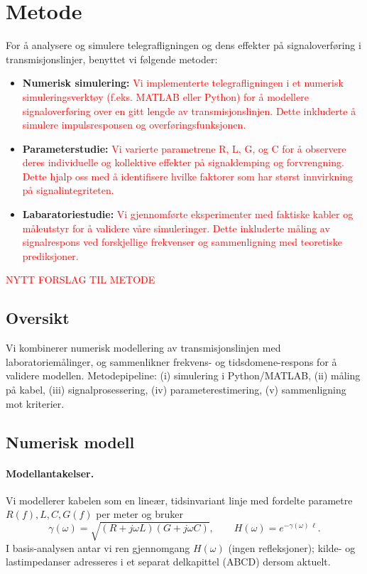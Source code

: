 \section{Metode}

For å analysere og simulere telegrafligningen og dens effekter på signaloverføring i transmisjonslinjer, benyttet vi følgende metoder:

\begin{itemize}
    
    \item \textbf{Numerisk simulering:} \textcolor{red}{Vi implementerte telegrafligningen i et numerisk simuleringsverktøy (f.eks. MATLAB eller Python) for å modellere signaloverføring over en gitt lengde av transmisjonslinjen. Dette inkluderte å simulere impulsresponsen og overføringsfunksjonen.}
    \item \textbf{Parameterstudie:} \textcolor{red}{Vi varierte parametrene R, L, G, og C for å observere deres individuelle og kollektive effekter på signaldemping og forvrengning. Dette hjalp oss med å identifisere hvilke faktorer som har størst innvirkning på signalintegriteten.}
    \item \textbf{Labaratoriestudie:}\textcolor{red}{ Vi gjennomførte eksperimenter med faktiske kabler og måleutstyr for å validere våre simuleringer. Dette inkluderte måling av signalrespons ved forskjellige frekvenser og sammenligning med teoretiske prediksjoner.}
\end{itemize}
\textcolor{red}{NYTT FORSLAG TIL METODE}

\subsection{Oversikt}
Vi kombinerer numerisk modellering av transmisjonslinjen med laboratoriemålinger, og sammenlikner frekvens- og tidsdomene-respons for å validere modellen. Metodepipeline:
(i) simulering i Python/MATLAB, (ii) måling på kabel, (iii) signalprosessering,
(iv) parameterestimering, (v) sammenligning mot kriterier.

\subsection{Numerisk modell}
\paragraph{Modellantakelser.}
Vi modellerer kabelen som en lineær, tidsinvariant linje med fordelte parametre $R(f),L,C,G(f)$ per meter og bruker
\[
\gamma(\omega)=\sqrt{(R+j\omega L)(G+j\omega C)},\qquad
H(\omega)=e^{-\gamma(\omega)\,\ell}.
\]
I basis-analysen antar vi ren gjennomgang $H(\omega)$ (ingen refleksjoner); kilde- og lastimpedanser adresseres i et separat delkapittel (ABCD) dersom aktuelt.

